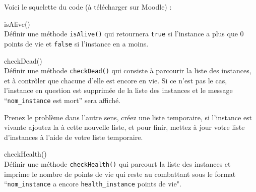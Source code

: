 Voici le squelette du code (à télécharger sur Moodle) : \\



\begin{Exercice}[5 minutes] isAlive()\\
    Définir une méthode \lstinline{isAlive()} qui retournera \lstinline{true} si l'instance a plus que 0 points de vie et \lstinline{false} si l'instance en a moins.

\begin{solution}
	
\end{solution}
\end{Exercice}


\begin{Exercice}[10 minutes] checkDead()\\
    Définir une méthode \lstinline{checkDead()} qui consiste à parcourir la liste des instances, et à contrôler que chacune d'elle est encore en vie. Si ce n'est pas le cas, l'instance en question est supprimée de la liste des instances et le message ``\lstinline{nom_instance} est mort'' sera affiché.
    
\begin{conseil}
Prenez le problème dans l'autre sens, créez une liste temporaire, si l'instance est vivante ajoutez la à cette nouvelle liste, et pour finir, mettez à jour votre liste d'instances à l'aide de votre liste temporaire.
\end{conseil}

\begin{solution}
	
\end{solution}
\end{Exercice}

\begin{Exercice}[5 minutes] checkHealth()\\
    Définir une méthode \lstinline{checkHealth()} qui parcourt la liste des instances et imprime le nombre de points de vie qui reste au combattant sous le format ``\lstinline{nom_instance} a encore \lstinline{health_instance} points de vie". 

\begin{solution}
	
\end{solution}
\end{Exercice}

